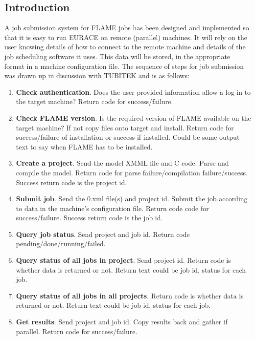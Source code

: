 \subsection{Introduction}

A job submission system for FLAME jobs has been designed and implemented  so that it is easy to run EURACE on remote (parallel) machines. It will rely on the user knowing details of how to connect to the remote machine and details of the job scheduling software it uses. This data will be stored, in the appropriate format in a machine configuration file. The sequence of steps for job submission was drawn up in discussion with TUBITEK and is as follows:

\begin{enumerate}
	\item \textbf{Check authentication}. Does the user provided information allow a log in to the target machine? Return code for success/failure.
    \item \textbf{Check FLAME version}. Is the required version of FLAME available on the target machine? If not copy files onto target and install. Return code for success/failure of installation or success if installed. Could be some output text to say when FLAME has to be installed.
    \item \textbf{Create a project}. Send the model XMML file and C code. Parse and compile the model. Return code for parse failure/compilation failure/success. Success return code is the project id.
    \item \textbf{Submit job}. Send the 0.xml file(s) and project id. Submit the job according to data in the machine's configuration file. Return code code for success/failure. Success return code is the job id.
    \item \textbf{Query job status}. Send project and job id. Return code pending/done/running/failed.
    \item \textbf{Query status of all jobs in project}. Send project id. Return code is whether data is returned or not. Return text could be {job id, status} for each job.
    \item \textbf{Query status of all jobs in all projects}. Return code is whether data is returned or not. Return text could be {job id, status} for each job.
    \item \textbf{Get results}. Send project and job id. Copy results back and gather if parallel. Return code for success/failure. 
\end{enumerate}

